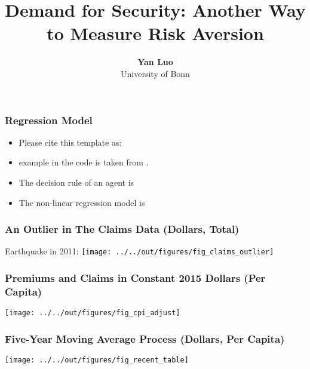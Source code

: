 \documentclass[11pt]{beamer}
\begin{document}
\title{Demand for Security: Another Way to Measure Risk Aversion}

\author[Yan Luo]
{
{\bf Yan Luo}\\
{\small University of Bonn}\\[1ex]
}


\begin{frame}
    \titlepage
    \note{~}
\end{frame}


\begin{frame}[t]
    \frametitle{Regression Model}
    \begin{itemize}
        \item<+-> Please cite this template as: \citet{GaudeckerEconProjectTemplates}
        \item<+-> \citet{Schelling69} example in the code is taken from \citet{StachurskiSargent13}.
        \item<+-> The decision rule of an agent is 
        \item<+-> The non-linear regression model is 
    \end{itemize}
    \note{~}
\end{frame}




\begin{frame}
    \frametitle{An Outlier in The Claims Data (Dollars, Total)}
    Earthquake in 2011:
    \texttt{[image: ../../out/figures/fig\_claims\_outlier]}

\end{frame}

\begin{frame}
    \frametitle{Premiums and Claims in Constant 2015 Dollars (Per Capita)}
    \texttt{[image: ../../out/figures/fig\_cpi\_adjust]}

\end{frame}

\begin{frame}
    \frametitle{Five-Year Moving Average Process (Dollars, Per Capita)}
    \texttt{[image: ../../out/figures/fig\_recent\_table]}

\end{frame}
\end{document}
